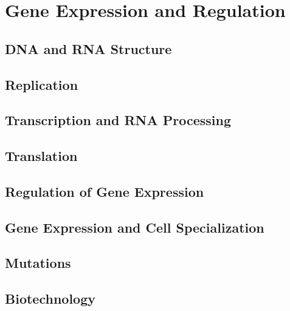 \documentclass[../bio.tex]{subfiles}
\begin{document}
\chapter{Gene Expression and Regulation}
\section{DNA and RNA Structure}
\section{Replication}
\section{Transcription and RNA Processing}
\section{Translation}
\section{Regulation of Gene Expression}
\section{Gene Expression and Cell Specialization}
\section{Mutations}
\section{Biotechnology}
\end{document}
